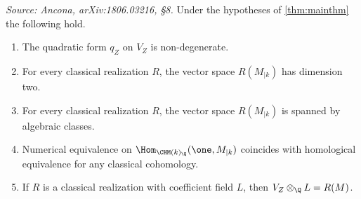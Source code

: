 \begin{proposition}
  \label{prop:mainthm-properties}
  \textit{Source: Ancona, arXiv:1806.03216, §8.}
  Under the hypotheses of \cref{thm:mainthm} the following hold.
  \begin{enumerate}
    \item The quadratic form \(q_Z\) on \(V_Z\) is non-degenerate.
    \item For every classical realization \(R\), the vector space
      \(R(M_{\vert{k}})\) has dimension two.
    \item For every classical realization \(R\), the vector space
      \(R(M_{\vert{k}})\) is spanned by algebraic classes.
    \item Numerical equivalence on \(\Hom_{\CHM(k)_\Q}(\one, M_{\vert{k}})\)
      coincides with homological equivalence for any classical cohomology.
    \item If \(R\) is a classical realization with coefficient field \(L\), then
      \(V_Z \otimes_\Q L = R(M)\).
  \end{enumerate}
\end{proposition}

